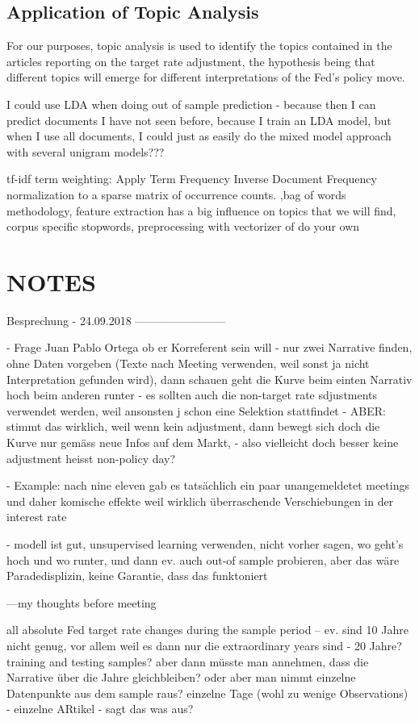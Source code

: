 \documentclass[11pt,a4paper,english,oneside]{book}
\numberwithin{equation}{chapter}
\begin{document}
\subsection{Application of Topic Analysis}
For our purposes, topic analysis is used to identify the topics contained in the articles reporting on the target rate adjustment, the hypothesis being that different topics will emerge for different interpretations of the Fed's policy move. 

I could use LDA when doing out of sample prediction - because then I can predict documents I have not seen before, because I train an LDA model, but when I use all documents, I could just as easily do the mixed model approach with several unigram models???

tf-idf term weighting: Apply Term Frequency Inverse Document Frequency normalization to a sparse matrix of occurrence counts. ,bag of words methodology, feature extraction has a big influence on topics that we will find, corpus specific stopwords, preprocessing with vectorizer of do your own


\section{NOTES}
Besprechung - 24.09.2018
------------------------

- Frage Juan Pablo Ortega ob er Korreferent sein will
- nur zwei Narrative finden, ohne Daten vorgeben (Texte nach Meeting verwenden, weil sonst ja nicht Interpretation gefunden wird), dann schauen geht die Kurve beim einten Narrativ hoch beim anderen runter
- es sollten auch die non-target rate sdjustments verwendet werden, weil ansonsten j schon eine Selektion stattfindet - ABER: stimmt das wirklich, weil wenn kein adjustment, dann bewegt sich doch die Kurve nur gemäss neue Infos auf dem Markt, - also vielleicht doch besser keine adjustment heisst non-policy day?

- Example: nach nine eleven gab es tatsächlich ein paar unangemeldetet meetings und daher komische effekte weil wirklich überraschende Verschiebungen in der interest rate

- modell ist gut, unsupervised learning verwenden, nicht vorher sagen, wo geht's hoch und wo runter, und dann ev. auch out-of sample probieren, aber das wäre Paradedisplizin, keine Garantie, dass das funktoniert

---my thoughts before meeting

all absolute Fed target rate changes during the sample period -- ev. sind 10 Jahre nicht genug, vor allem weil es dann nur die extraordinary years sind - 20 Jahre? training and testing samples? aber dann müsste man annehmen, dass die Narrative über die Jahre gleichbleiben? oder aber man nimmt einzelne Datenpunkte aus dem sample raus? einzelne Tage (wohl zu wenige Observations) - einzelne ARtikel - sagt das was aus?
\end{document}
